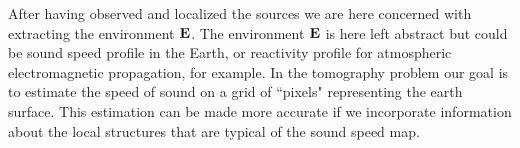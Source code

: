 
After having observed and localized the sources we are here concerned with extracting  the environment $\bf E$. The environment $\bf E$ is here left abstract but could be sound speed profile in the Earth, or reactivity profile for atmospheric electromagnetic propagation, for example.
In the tomography problem our goal is to estimate the speed of sound on a grid of ``pixels" 
representing the earth surface. This estimation can be made more accurate if we incorporate information
about the local structures that are typical of the sound speed map.

